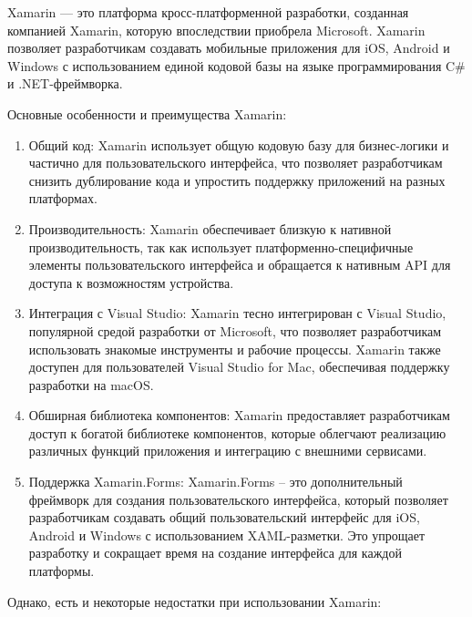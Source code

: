 \documentclass[14pt, russian]{scrartcl}
\begin{document}
Xamarin\cite{xamarin} --- это платформа кросс-платформенной разработки, созданная компанией Xamarin, которую впоследствии приобрела Microsoft. Xamarin позволяет разработчикам создавать мобильные приложения для iOS, Android и Windows с использованием единой кодовой базы на языке программирования C\# и .NET-фреймворка.

Основные особенности и преимущества Xamarin:
\begin{enumerate}
    \item Общий код: Xamarin использует общую кодовую базу для бизнес-логики и частично для пользовательского интерфейса, что позволяет разработчикам снизить дублирование кода и упростить поддержку приложений на разных платформах.
    \item Производительность: Xamarin обеспечивает близкую к нативной производительность, так как использует платформенно-специфичные элементы пользовательского интерфейса и обращается к нативным API для доступа к возможностям устройства.
    \item Интеграция с Visual Studio: Xamarin тесно интегрирован с Visual Studio, популярной средой разработки от Microsoft, что позволяет разработчикам использовать знакомые инструменты и рабочие процессы. Xamarin также доступен для пользователей Visual Studio for Mac, обеспечивая поддержку разработки на macOS.
    \item Обширная библиотека компонентов: Xamarin предоставляет разработчикам доступ к богатой библиотеке компонентов, которые облегчают реализацию различных функций приложения и интеграцию с внешними сервисами.
    \item Поддержка Xamarin.Forms: Xamarin.Forms – это дополнительный фреймворк для создания пользовательского интерфейса, который позволяет разработчикам создавать общий пользовательский интерфейс для iOS, Android и Windows с использованием XAML-разметки. Это упрощает разработку и сокращает время на создание интерфейса для каждой платформы.
\end{enumerate}

Однако, есть и некоторые недостатки при использовании Xamarin:
\end{document}
